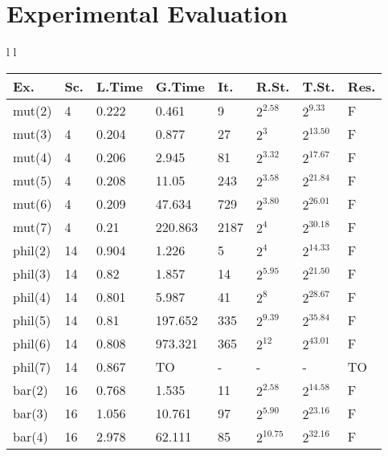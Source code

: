 \section{Experimental Evaluation}\label{sec:examples}
{\tiny
\begin{table}[!ht]
\begin{tabular}{l l}
\begin{minipage}[b]{0.45\linewidth}
    \centering
    \vspace{-0.5cm}
    \begin{tabular}{|l|l|l|l|l|l|l|l|}
    \hline
        Ex. & Sc. & L.Time & G.Time & It. & R.St. & T.St. & Res. \\ \hline
        \textsf{mut(2)} & 4 & 0.222 & 0.461 & 9 & $2^{2.58}$ & $2^{9.33}$ & F \\ \hline
        \textsf{mut(3)} & 4 & 0.204 & 0.877 & 27 & $2^3$ & $2^{13.50}$ & F \\ \hline
        \textsf{mut(4)} & 4 & 0.206 & 2.945 & 81 & $2^{3.32}$ & $ 2^{17.67}$ & F \\ \hline
        \textsf{mut(5)} & 4 & 0.208 & 11.05 & 243 & $ 2^{3.58}$ & $ 2^{21.84}$ & F \\ \hline
        \textsf{mut(6)} & 4 & 0.209 & 47.634 & 729 & $ 2^{3.80}$ & $ 2^{26.01}$ & F \\ \hline
        \textsf{mut(7)} & 4 & 0.21 & 220.863 & 2187 & $ 2^4$ & $ 2^{30.18}$ & F \\ \hline
        \textsf{phil(2)} & 14 & 0.904 & 1.226 & 5  & $2^4$ & $2^{14.33}$ & F \\ \hline
        \textsf{phil(3)} & 14 & 0.82 & 1.857 & 14 & $ 2^{5.95}$ & $2^{21.50}$ & F \\ \hline
        \textsf{phil(4)} & 14 & 0.801 & 5.987 & 41 & $2^8$ & $2^{28.67}$ & F \\ \hline
        \textsf{phil(5)} & 14 & 0.81 & 197.652 & 335 & $2^{9.39}$ & $2^{35.84}$ & F \\ \hline
        \textsf{phil(6)} & 14 & 0.808 & 973.321 & 365 & $2^{12}$ & $2^{43.01}$ & F \\ \hline
        \textsf{phil(7)} & 14 & 0.867 & TO & - & - & - & TO \\ \hline
        \textsf{bar(2)} & 16 & 0.768 & 1.535 & 11 & $2^{2.58}$ & $2^{14.58}$ & F \\ \hline
        \textsf{bar(3)} & 16 & 1.056 & 10.761 & 97 & $2^{5.90}$ & $2^{23.16}$ & F \\ \hline
        \textsf{bar(4)} & 16 & 2.978 & 62.111 & 85 & $2^{10.75}$ & $2^{32.16}$ & F \\ \hline

\end{tabular}
\end{minipage}
\end{tabular}
\end{table}}
